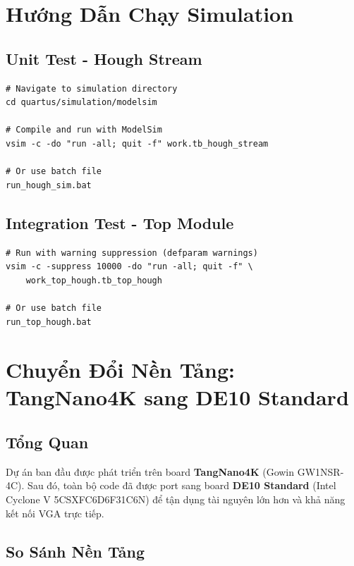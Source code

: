 \documentclass[12pt,a4paper]{article}
\begin{document}
\section{Hướng Dẫn Chạy Simulation}

\subsection{Unit Test - Hough Stream}

\begin{verbatim}
# Navigate to simulation directory
cd quartus/simulation/modelsim

# Compile and run with ModelSim
vsim -c -do "run -all; quit -f" work.tb_hough_stream

# Or use batch file
run_hough_sim.bat
\end{verbatim}

\subsection{Integration Test - Top Module}

\begin{verbatim}
# Run with warning suppression (defparam warnings)
vsim -c -suppress 10000 -do "run -all; quit -f" \
    work_top_hough.tb_top_hough

# Or use batch file
run_top_hough.bat
\end{verbatim}

\section{Chuyển Đổi Nền Tảng: TangNano4K sang DE10 Standard}

\subsection{Tổng Quan}

Dự án ban đầu được phát triển trên board \textbf{TangNano4K} (Gowin GW1NSR-4C). Sau đó, toàn bộ code đã được port sang board \textbf{DE10 Standard} (Intel Cyclone V 5CSXFC6D6F31C6N) để tận dụng tài nguyên lớn hơn và khả năng kết nối VGA trực tiếp.

\subsection{So Sánh Nền Tảng}
\end{document}
